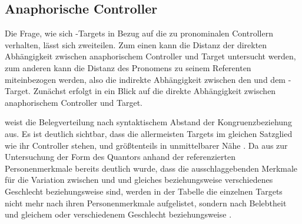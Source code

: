 \subsection{Anaphorische Controller}
\label{subsec:caodistanactrl}

Die Frage, wie sich -Targets in Bezug auf die  zu
pronominalen Controllern verhalten, lässt sich zweiteilen. Zum einen kann die
Distanz der direkten Abhängigkeit zwischen anaphorischem Controller und Target
untersucht werden, zum anderen kann die Distanz des
Pronomens zu seinem Referenten miteinbezogen werden, also die indirekte
Abhängigkeit zwischen den  und dem
-Target. Zunächst erfolgt in  ein Blick auf
die direkte Abhängigkeit zwischen anaphorischem Controller und Target.

 weist die Belegverteilung
nach syntaktischem Abstand der
Kongruenzbeziehung aus. Es ist deutlich sichtbar, dass
die allermeisten Targets im gleichen Satzglied wie ihr Controller stehen, und
größtenteils in unmittelbarer Nähe \autocite[vgl.][526--527]{ksw2}. Da aus
 zur Untersuchung der Form des Quantors 
anhand der referenzierten Personenmerkmale bereits deutlich
wurde, dass die ausschlaggebenden Merkmale für die Variation zwischen
 und   und gleiches beziehungsweise
verschiedenes Geschlecht beziehungsweise  sind, werden in der
Tabelle die einzelnen Targets nicht mehr nach ihren Personenmerkmale
aufgelistet, sondern nach Belebtheit und gleichem oder verschiedenem Geschlecht
beziehungsweise .

